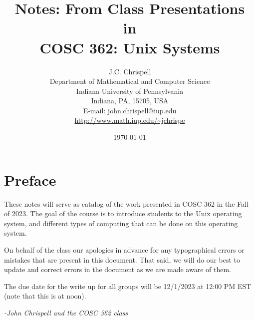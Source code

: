 \documentclass[12pt]{book}
\begin{document}
\title{Notes: From Class Presentations \\in\\ COSC 362: Unix Systems} 

\author{J.C. Chrispell \\ Department of Mathematical and Computer Science \\ Indiana University of Pennsylvania \\ Indiana, PA, 15705, USA \\ E-mail: john.chrispell@iup.edu
\\ \url{http://www.math.iup.edu/~jchrispe}}

\date{\today}

\maketitle
\baselineskip14pt
\chapter*{Preface}
These notes will serve as catalog of the work presented in COSC 362 in the Fall of 2023. The goal of the course is to introduce students to the Unix operating system, and different types of computing that can be done on this operating system. 

On behalf of the class our apologies in advance for any typographical errors or mistakes that are present in this document. That said, we will do our best to update and correct errors in the document as we are made aware of them. 

The due date for the write up for all groups will be 12/1/2023 at 12:00 PM EST (note that this is at noon). 


\begin{flushright}
{\it -John Chrispell and the COSC 362 class}
\end{flushright}
\tableofcontents
{}
\clearpage


\end{document}
